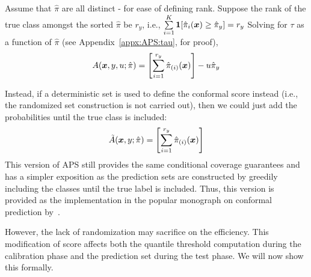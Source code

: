 Assume that $\hat{\pi}$ are all distinct - for ease of defining rank.
Suppose the rank of the true class amongst the sorted $\hat{\pi}$ be $r_y$, i.e., $\sum\limits_{i=1}^K \bm{1}[\hat{\pi}_i({\bm{x}}) \geq \hat{\pi}_{y}] = r_y$
Solving for $\tau$ as a function of $\hat{\pi}$  (see Appendix~\ref{appx:APS:tau}, for proof),
\begin{align}
A({\bm{x}}, y, u;\hat{\pi}) = \left[ \sum\limits_{i=1}^{r_y} \hat{\pi}_{(i)}({\bm{x}}) \right] - u \hat{\pi}_{y}
\end{align}

Instead, if a deterministic set is used to define the conformal score instead (i.e., the randomized set construction is not carried out), then we could just add the probabilities until the true class is included:
\begin{align}
    \Tilde{A}({\bm{x}}, y;\hat{\pi}) = \left[ \sum\limits_{i=1}^{r_y} \hat{\pi}_{(i)}({\bm{x}}) \right]
\end{align}
This version of APS still provides the same conditional coverage guarantees and has a simpler exposition as the prediction sets are constructed by greedily including the classes until the true label is included.
 Thus, this version is provided as the implementation in the popular monograph on conformal prediction by~\citet{angelopoulos2021gentle, angelopoulos2023conformal}.

However, the lack of randomization may sacrifice on the efficiency. 
This modification of score affects both the quantile threshold computation during the calibration phase and the prediction set during the test phase.
We will now show this formally.

